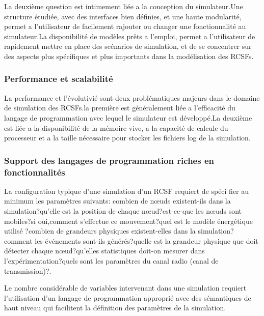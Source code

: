 La deuxième question est intimement liée a la conception du simulateur.Une structure étudiée, avec des interfaces bien définies, et une haute modularité, permet a l'utilisateur de facilement rajouter ou changer une fonctionnalité au simulateur.La disponibilité de modèles prêts a l'emploi, permet a l'utilisateur de rapidement mettre en place des scénarios de simulation, et de se concentrer sur des aspects plus spécifiques et plus importants dans la modélisation des RCSFs.
\subsubsection{Performance et scalabilité }
La performance et l'évolutivié sont deux problématiques majeurs dans le domaine de simulation des RCSFs.la première est généralement liée a l'efficacité du langage de programmation avec lequel le simulateur est développé.La deuxième est liée a la disponibilité de la mémoire vive, a la capacité de calcule du processeur et a la taille nécessaire pour stocker les fichiers log de la simulation.
\subsubsection{Support des langages de programmation riches en fonctionnalités}
La configuration typique d'une simulation d'un RCSF requiert de spéci fier au minimum les paramètres suivants:
combien de nœuds existent-ils dans la simulation?qu'elle est la position de chaque nœud?est-ce-que les nœuds sont mobiles?si oui,comment s'effectue ce mouvement?quel est le modèle énergétique utilisé ?combien de grandeurs physiques existent-elles dans la simulation?comment les événements sont-ils générés?quelle est la grandeur physique que doit détecter chaque nœud?qu'elles statistiques doit-on mesurer dans l'expérimentation?quels sont les paramètres du canal radio (canal de transmission)?.

Le nombre considérable de variables intervenant dans une simulation requiert l'utilisation d'un langage de programmation approprié avec des sémantiques de haut niveau  qui facilitent la définition des  paramètres de la simulation.
